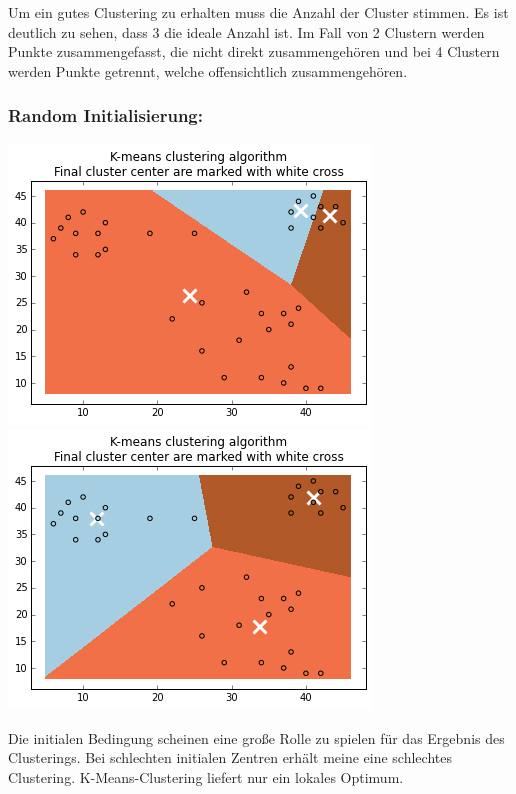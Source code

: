 \documentclass[a4paper,parskip=full-]{article}
\begin{document}
Um ein gutes Clustering zu erhalten muss die Anzahl der Cluster stimmen. Es ist deutlich zu sehen, dass 3 die ideale Anzahl ist. Im Fall von 2 Clustern werden Punkte zusammengefasst, die nicht direkt zusammengehören und bei 4 Clustern werden Punkte getrennt, welche offensichtlich zusammengehören. 
\subsubsection{Random Initialisierung: }

\begin{minipage}{\textwidth}
	\includegraphics[scale=0.5]{spaeth_01_3clu_ran.png}
\includegraphics[scale=0.5]{spaeth_01_3clu_ran42.png}
\end{minipage} \newline

Die initialen Bedingung scheinen eine große Rolle zu spielen für das Ergebnis des Clusterings. Bei schlechten initialen Zentren erhält meine eine schlechtes Clustering. K-Means-Clustering liefert nur ein lokales Optimum. \\
\end{document}
